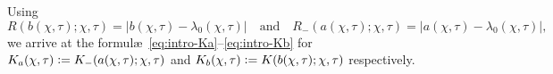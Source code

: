 Using
\begin{equation}
R(b(\chi,\tau);\chi,\tau) = |b(\chi,\tau)-\lambda_0(\chi,\tau)|\quad\text{and}\quad R_-(a(\chi,\tau);\chi,\tau) = |a(\chi,\tau)-\lambda_0(\chi,\tau)|,
\label{eq:R-a-b}
\end{equation}
we arrive at the formul\ae\ \eqref{eq:intro-Ka}--\eqref{eq:intro-Kb} for $K_a(\chi,\tau)\vcentcolon= K_-(a(\chi,\tau);\chi,\tau)$ and $K_b(\chi,\tau)\vcentcolon= K(b(\chi,\tau);\chi,\tau)$ respectively.

